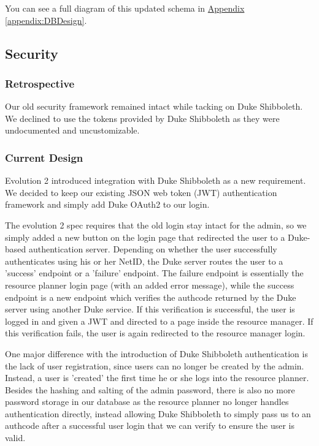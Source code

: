 \documentclass[12pt]{article}
\begin{document}
You can see a full diagram of this updated schema in  \hyperref[appendix:DBDesign]{Appendix \ref{appendix:DBDesign}}. 

\subsection{Security}
\subsubsection{Retrospective}
Our old security framework remained intact while tacking on Duke Shibboleth. We declined to use the tokens provided by Duke Shibboleth as they were undocumented and uncustomizable. 

\subsubsection{Current Design}
Evolution 2 introduced integration with Duke Shibboleth as a new requirement. We decided to keep our existing JSON web token (JWT) authentication framework and simply add Duke OAuth2 to our login. 

The evolution 2 spec requires that the old login stay intact for the admin, so we simply added a new button on the login page that redirected the user to a Duke-based authentication server. Depending on whether the user successfully authenticates using his or her NetID, the Duke server routes the user to a 'success' endpoint or a 'failure' endpoint. The failure endpoint is essentially the resource planner login page (with an added error message), while the success endpoint is a new endpoint which verifies the authcode returned by the Duke server using another Duke service. If this verification is successful, the user is logged in and given a JWT and directed to a page inside the resource manager. If this verification fails, the user is again redirected to the resource manager login. 

One major difference with the introduction of Duke Shibboleth authentication is the lack of user registration, since users can no longer be created by the admin. Instead, a user is 'created' the first time he or she logs into the resource planner. Besides the hashing and salting of the admin password, there is also no more password storage in our database as the resource planner no longer handles authentication directly, instead allowing Duke Shibboleth to simply pass us to an authcode after a successful user login that we can verify to ensure the user is valid. 
\end{document}

